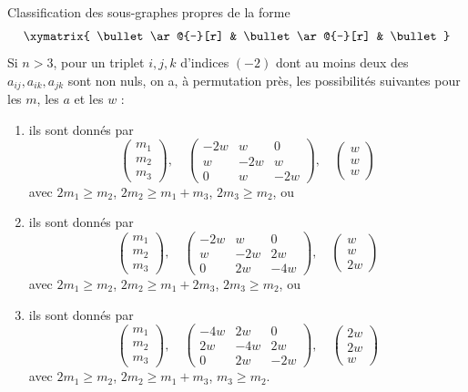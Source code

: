 \begin{lemma}
\label{lemma-three-by-three}
Classification des sous-graphes propres de la forme
$$
\xymatrix{
\bullet \ar@{-}[r] &
\bullet \ar@{-}[r] &
\bullet
}
$$
Si $n > 3$, pour un triplet $i, j, k$ d'indices $(-2)$
dont au moins deux des $a_{ij}, a_{ik}, a_{jk}$ sont non nuls, on a,
à permutation près, les possibilités suivantes pour les $m$, les $a$ et les $w$ :
\begin{enumerate}
\item
\label{item-A3}
ils sont donnés par
$$
\left(
\begin{matrix}
m_1 \\
m_2 \\
m_3
\end{matrix}
\right),
\quad
\left(
\begin{matrix}
-2w & w & 0 \\
w & -2w & w \\
0 & w & -2w
\end{matrix}
\right),
\quad
\left(
\begin{matrix}
w \\
w \\
w
\end{matrix}
\right)
$$
avec $2m_1 \geq m_2$, $2m_2 \geq m_1 + m_3$, $2m_3 \geq m_2$, ou
\item
\label{item-C3}
ils sont donnés par
$$
\left(
\begin{matrix}
m_1 \\
m_2 \\
m_3
\end{matrix}
\right),
\quad
\left(
\begin{matrix}
-2w & w & 0 \\
w & -2w & 2w \\
0 & 2w & -4w
\end{matrix}
\right),
\quad
\left(
\begin{matrix}
w \\
w \\
2w
\end{matrix}
\right)
$$
avec $2m_1 \geq m_2$, $2m_2 \geq m_1 + 2m_3$, $2m_3 \geq m_2$, ou
\item
\label{item-B3}
ils sont donnés par
$$
\left(
\begin{matrix}
m_1 \\
m_2 \\
m_3
\end{matrix}
\right),
\quad
\left(
\begin{matrix}
-4w & 2w & 0 \\
2w & -4w & 2w \\
0 & 2w & -2w
\end{matrix}
\right),
\quad
\left(
\begin{matrix}
2w \\
2w \\
w
\end{matrix}
\right)
$$
avec $2m_1 \geq m_2$, $2m_2 \geq m_1 + m_3$, $m_3 \geq m_2$.
\end{enumerate}
\end{lemma}

